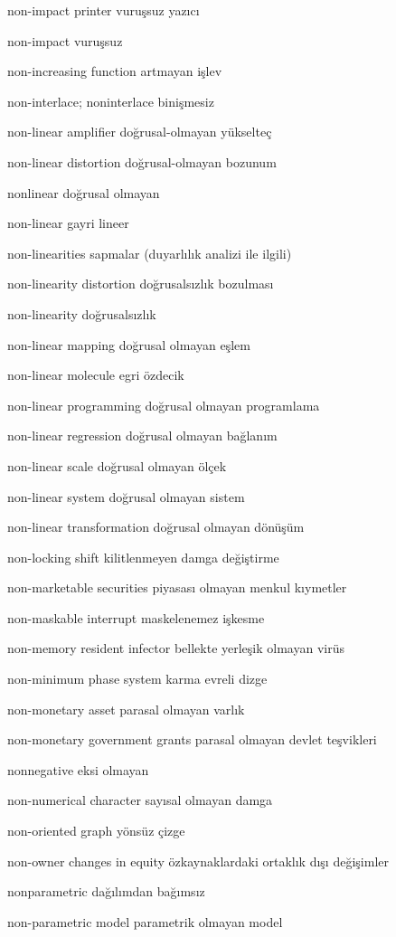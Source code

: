 \documentclass[12pt,fleqn]{article}\usepackage{../../common}
\begin{document}
non-impact printer vuruşsuz yazıcı

non-impact vuruşsuz

non-increasing function artmayan işlev

non-interlace; noninterlace binişmesiz

non-linear amplifier doğrusal-olmayan yükselteç

non-linear distortion doğrusal-olmayan bozunum

nonlinear doğrusal olmayan

non-linear gayri lineer

non-linearities sapmalar (duyarlılık analizi ile ilgili)

non-linearity distortion doğrusalsızlık bozulması

non-linearity doğrusalsızlık

non-linear mapping doğrusal olmayan eşlem

non-linear molecule egri özdecik

non-linear programming doğrusal olmayan programlama

non-linear regression doğrusal olmayan bağlanım

non-linear scale doğrusal olmayan ölçek

non-linear system doğrusal olmayan sistem

non-linear transformation doğrusal olmayan dönüşüm

non-locking shift kilitlenmeyen damga değiştirme

non-marketable securities piyasası olmayan menkul kıymetler

non-maskable interrupt maskelenemez işkesme

non-memory resident infector bellekte yerleşik olmayan virüs

non-minimum phase system karma evreli dizge

non-monetary asset parasal olmayan varlık

non-monetary government grants parasal olmayan devlet teşvikleri

nonnegative eksi olmayan

non-numerical character sayısal olmayan damga

non-oriented graph yönsüz çizge

non-owner changes in equity özkaynaklardaki ortaklık dışı değişimler

nonparametric dağılımdan bağımsız

non-parametric model parametrik olmayan model
\end{document}
